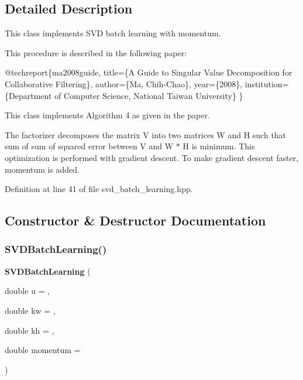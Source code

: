 \subsection{Detailed Description}
This class implements S\+VD batch learning with momentum. 

This procedure is described in the following paper\+:


\begin{DoxyCode}
@techreport\{ma2008guide,
  title=\{A Guide to Singular Value Decomposition \textcolor{keywordflow}{for} Collaborative
      Filtering\},
  author=\{Ma, Chih-Chao\},
  year=\{2008\},
  institution=\{Department of Computer Science, National Taiwan University\}
\}
\end{DoxyCode}


This class implements \textquotesingle{}Algorithm 4\textquotesingle{} as given in the paper.

The factorizer decomposes the matrix V into two matrices W and H such that sum of sum of squared error between V and W $\ast$ H is minimum. This optimization is performed with gradient descent. To make gradient descent faster, momentum is added. 

Definition at line 41 of file svd\+\_\+batch\+\_\+learning.\+hpp.



\subsection{Constructor \& Destructor Documentation}
\mbox{\label{classmlpack_1_1amf_1_1SVDBatchLearning_aaec0e3862d8b79920ea8ecda25dfcfba}} 
\subsubsection{S\+V\+D\+Batch\+Learning()}
{\footnotesize\ttfamily \textbf{ S\+V\+D\+Batch\+Learning} (\begin{DoxyParamCaption}\item[{double}]{u = {},  }\item[{double}]{kw = {},  }\item[{double}]{kh = {},  }\item[{double}]{momentum = {} }\end{DoxyParamCaption})\hspace{0.3cm}{\ttfamily [inline]}}



